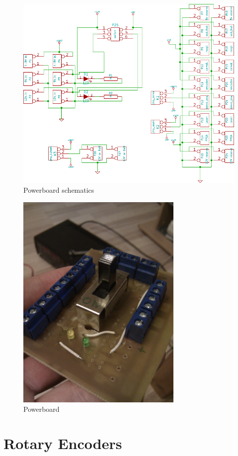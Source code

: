 \documentclass[a4paper
               ,10pt
               ,DIV=10 %
               ,BCOR=0.3cm
               ,pagesize %
               ,headings=small
               ,bibtotoc
               ]
               {scrartcl}
\begin{document}
\begin{figure}[H]
\begin{center}
\includegraphics[width=0.7\linewidth]{pic/powerboard}
\caption{Powerboard schematics}
\label{figpowerboardscm}
\end{center}
\end{figure}

\begin{figure}[H]
\begin{center}
\includegraphics[width=8cm]{pic/powerboardr.jpg}
\caption{Powerboard}
\label{figpowerboardr}
\end{center}
\end{figure}


\section{Rotary Encoders} \label{sensors}
\end{document}
